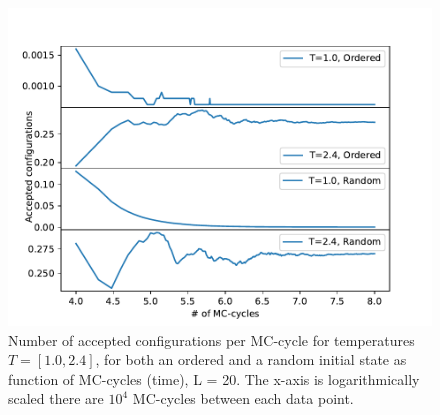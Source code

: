 \documentclass[12pt,english,a4paper]{article}
\begin{document}
\begin{figure}[H]
    \centering
    \includegraphics[scale=0.7]{Figures/Number_of_Accepted_Configs_L_20.pdf}
    \caption{Number of accepted configurations per MC-cycle for temperatures $T=[1.0,2.4]$, for both an ordered and a random initial state as function of MC-cycles (time), L = 20. The x-axis is logarithmically scaled there are $10^4$ MC-cycles between each data point.}
    \label{fig:acc_conf}
\end{figure}
\end{document}
